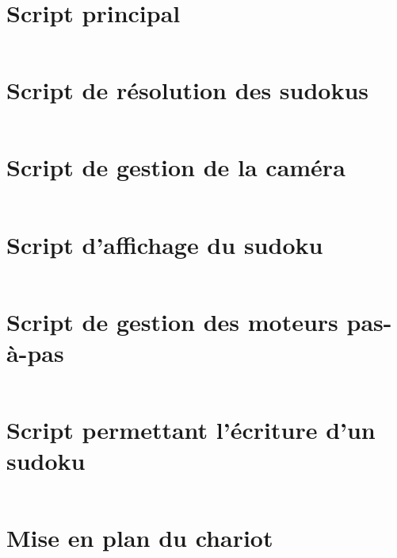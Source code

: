 \printbibliography
\nocite{*}
\appendix

\begin{changemargin}{-2cm}{-4cm}

\label{Scripts}
\chapter*{Script principal}
\label{main}
\inputminted[fontsize=\scriptsize, linenos=true]{Python}{../script/main.py}

\chapter*{Script de résolution des sudokus}
\label{resolution}
\inputminted[fontsize=\scriptsize, linenos=true]{Python}{../script/resolution.py}

\chapter*{Script de gestion de la caméra}
\label{camera}
\inputminted[fontsize=\scriptsize, linenos=true]{Python}{../script/camera.py}

\chapter*{Script d'affichage du sudoku}
\label{display}
\inputminted[fontsize=\scriptsize, linenos=true]{Python}{../script/display.py}

\chapter*{Script de gestion des moteurs pas-à-pas}
\label{step_motor}
\inputminted[fontsize=\scriptsize, linenos=true]{Python}{../script/step_motor.py}

\chapter*{Script permettant l'écriture d'un sudoku}
\label{write}
\inputminted[fontsize=\scriptsize, linenos=true]{Python}{../script/write.py}


\chapter*{Mise en plan du chariot}


\end{changemargin}
